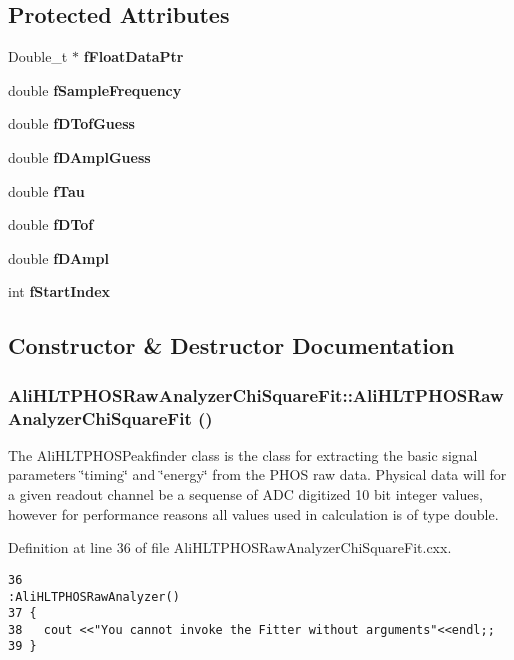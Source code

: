 \subsection*{Protected Attributes}
\begin{CompactItemize}
\item 
Double\_\-t $\ast$ {\bf f\-Float\-Data\-Ptr}
\item 
double {\bf f\-Sample\-Frequency}
\item 
double {\bf f\-DTof\-Guess}
\item 
double {\bf f\-DAmpl\-Guess}
\item 
double {\bf f\-Tau}
\item 
double {\bf f\-DTof}
\item 
double {\bf f\-DAmpl}
\item 
int {\bf f\-Start\-Index}
\end{CompactItemize}


\subsection{Constructor \& Destructor Documentation}
\subsubsection{\setlength{\rightskip}{0pt plus 5cm}Ali\-HLTPHOSRaw\-Analyzer\-Chi\-Square\-Fit::Ali\-HLTPHOSRaw\-Analyzer\-Chi\-Square\-Fit ()}\label{classAliHLTPHOSRawAnalyzerChiSquareFit_AliHLTPHOSRawAnalyzerChiSquareFita0}


The Ali\-HLTPHOSPeakfinder class is the class for extracting the basic signal parameters \char`\"{}timing\char`\"{} and \char`\"{}energy\char`\"{} from the PHOS raw data. Physical data will for a given readout channel be a sequense of ADC digitized 10 bit integer values, however for performance reasons all values used in calculation is of type double. 

Definition at line 36 of file Ali\-HLTPHOSRaw\-Analyzer\-Chi\-Square\-Fit.cxx.

\footnotesize\begin{verbatim}36                                                                     :AliHLTPHOSRawAnalyzer()
37 {
38   cout <<"You cannot invoke the Fitter without arguments"<<endl;;
39 }
\end{verbatim}\normalsize 



